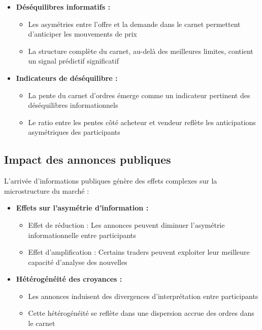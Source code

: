 \documentclass[12pt,a4paper]{article}
\theoremstyle{definition}
\theoremstyle{remark}
\begin{document}
    \begin{itemize}
        \item \textbf{Déséquilibres informatifs :} 
        \begin{itemize}
            \item Les asymétries entre l'offre et la demande dans le carnet permettent d'anticiper les mouvements de prix
            \item La structure complète du carnet, au-delà des meilleures limites, contient un signal prédictif significatif
        \end{itemize}
        
        \item \textbf{Indicateurs de déséquilibre :}
        \begin{itemize}
            \item La pente du carnet d'ordres émerge comme un indicateur pertinent des déséquilibres informationnels
            \item Le ratio entre les pentes côté acheteur et vendeur reflète les anticipations asymétriques des participants
        \end{itemize}
    \end{itemize}

    \subsection{Impact des annonces publiques}

    L'arrivée d'informations publiques génère des effets complexes sur la microstructure du marché :

    \begin{itemize}
        \item \textbf{Effets sur l'asymétrie d'information :}
        \begin{itemize}
            \item Effet de réduction : Les annonces peuvent diminuer l'asymétrie informationnelle entre participants
            \item Effet d'amplification : Certains traders peuvent exploiter leur meilleure capacité d'analyse des nouvelles
        \end{itemize}
        
        \item \textbf{Hétérogénéité des croyances :}
        \begin{itemize}
            \item Les annonces induisent des divergences d'interprétation entre participants
            \item Cette hétérogénéité se reflète dans une dispersion accrue des ordres dans le carnet
        \end{itemize}
    \end{itemize}
\end{document}
